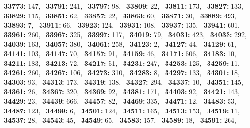 \textbf{33773:} 147,\allowbreak~ 
\textbf{33791:} 241,\allowbreak~ 
\textbf{33797:} 98,\allowbreak~ 
\textbf{33809:} 22,\allowbreak~ 
\textbf{33811:} 173,\allowbreak~ 
\textbf{33827:} 133,\allowbreak~ 
\textbf{33829:} 115,\allowbreak~ 
\textbf{33851:} 62,\allowbreak~ 
\textbf{33857:} 22,\allowbreak~ 
\textbf{33863:} 60,\allowbreak~ 
\textbf{33871:} 30,\allowbreak~ 
\textbf{33889:} 493,\allowbreak~ 
\textbf{33893:} 7,\allowbreak~ 
\textbf{33911:} 66,\allowbreak~ 
\textbf{33923:} 124,\allowbreak~ 
\textbf{33931:} 108,\allowbreak~ 
\textbf{33937:} 135,\allowbreak~ 
\textbf{33941:} 601,\allowbreak~ 
\textbf{33961:} 260,\allowbreak~ 
\textbf{33967:} 325,\allowbreak~ 
\textbf{33997:} 117,\allowbreak~ 
\textbf{34019:} 79,\allowbreak~ 
\textbf{34031:} 423,\allowbreak~ 
\textbf{34033:} 292,\allowbreak~ 
\textbf{34039:} 163,\allowbreak~ 
\textbf{34057:} 380,\allowbreak~ 
\textbf{34061:} 258,\allowbreak~ 
\textbf{34123:} 2,\allowbreak~ 
\textbf{34127:} 44,\allowbreak~ 
\textbf{34129:} 61,\allowbreak~ 
\textbf{34141:} 103,\allowbreak~ 
\textbf{34147:} 70,\allowbreak~ 
\textbf{34157:} 91,\allowbreak~ 
\textbf{34159:} 46,\allowbreak~ 
\textbf{34171:} 506,\allowbreak~ 
\textbf{34183:} 10,\allowbreak~ 
\textbf{34211:} 183,\allowbreak~ 
\textbf{34213:} 72,\allowbreak~ 
\textbf{34217:} 51,\allowbreak~ 
\textbf{34231:} 247,\allowbreak~ 
\textbf{34253:} 125,\allowbreak~ 
\textbf{34259:} 11,\allowbreak~ 
\textbf{34261:} 260,\allowbreak~ 
\textbf{34267:} 106,\allowbreak~ 
\textbf{34273:} 310,\allowbreak~ 
\textbf{34283:} 8,\allowbreak~ 
\textbf{34297:} 133,\allowbreak~ 
\textbf{34301:} 18,\allowbreak~ 
\textbf{34303:} 93,\allowbreak~ 
\textbf{34313:} 173,\allowbreak~ 
\textbf{34319:} 138,\allowbreak~ 
\textbf{34327:} 294,\allowbreak~ 
\textbf{34337:} 10,\allowbreak~ 
\textbf{34351:} 145,\allowbreak~ 
\textbf{34361:} 26,\allowbreak~ 
\textbf{34367:} 320,\allowbreak~ 
\textbf{34369:} 92,\allowbreak~ 
\textbf{34381:} 171,\allowbreak~ 
\textbf{34403:} 92,\allowbreak~ 
\textbf{34421:} 143,\allowbreak~ 
\textbf{34429:} 23,\allowbreak~ 
\textbf{34439:} 666,\allowbreak~ 
\textbf{34457:} 82,\allowbreak~ 
\textbf{34469:} 335,\allowbreak~ 
\textbf{34471:} 12,\allowbreak~ 
\textbf{34483:} 53,\allowbreak~ 
\textbf{34487:} 123,\allowbreak~ 
\textbf{34499:} 6,\allowbreak~ 
\textbf{34501:} 124,\allowbreak~ 
\textbf{34511:} 165,\allowbreak~ 
\textbf{34513:} 153,\allowbreak~ 
\textbf{34519:} 11,\allowbreak~ 
\textbf{34537:} 28,\allowbreak~ 
\textbf{34543:} 45,\allowbreak~ 
\textbf{34549:} 65,\allowbreak~ 
\textbf{34583:} 157,\allowbreak~ 
\textbf{34589:} 18,\allowbreak~ 
\textbf{34591:} 264,\allowbreak~ 
